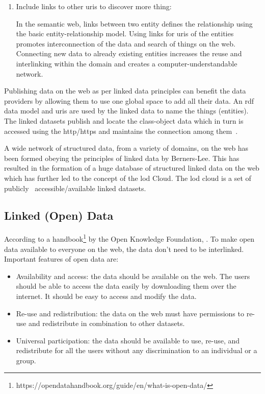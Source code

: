 \begin{doublespace}
\begin{enumerate}
  \item Include links to other \ac{uri}s to discover more thing:
  \par In the semantic web, links between two entity defines the relationship using the basic entity-relationship model. Using links for \ac{uri}s of the entities promotes interconnection of the data and search of things on the web. Connecting new data to already existing entities increases the reuse and interlinking within the domain and creates a computer-understandable network.
\end{enumerate}
\par Publishing data on the web as per linked data principles can benefit the data providers by allowing them to use one global space to add all their data. An \ac{rdf} data model and \ac{uri}s are used by the linked data to name the things (entities). The linked datasets publish and locate the class-object data which in turn is accessed using the \ac{http}/\ac{https} and maintains the connection among them~\cite{bauer2011linked}. 
\par A wide network of structured data, from a variety of domains, on the web has been formed obeying the principles of linked data by Berners-Lee. This has resulted in the formation of a huge database of structured linked data on the web which has further led to the concept of the \ac{lod} Cloud. The \ac{lod} cloud is a set of publicly~\cite{berners1998universal} accessible/available linked datasets.
\subsection{Linked (Open) Data}
\par According to a handbook\footnote{https://opendatahandbook.org/guide/en/what-is-open-data/} by the Open Knowledge Foundation, . To make open data available to everyone on the web, the data don't need to be interlinked. Important features of open data are:
\begin{itemize}
  \item Availability and access: the data should be available on the web. The users should be able to access the data easily by downloading them over the internet. It should be easy to access and modify the data.
  \item Re-use and redistribution: the data on the web must have permissions to re-use and redistribute in combination to other datasets.
  \item Universal participation: the data should be available to use, re-use, and redistribute for all the users without any discrimination to an individual or a group.
\end{itemize}

\end{doublespace}
